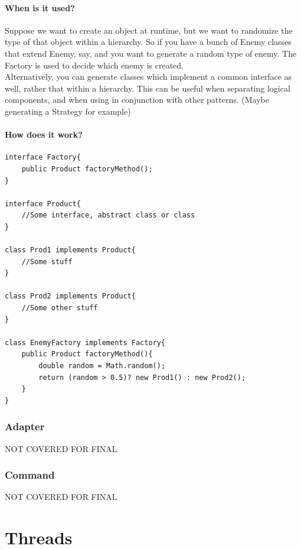 \documentclass[12pt]{article}
\theoremstyle{definition}
\begin{document}
\subsection{When is it used?}
Suppose we want to create an object at runtime, but we want to randomize the type of that object within a hierarchy. So if you have a bunch of Enemy classes that extend Enemy, say, and you want to generate a random type of enemy. The Factory is used to decide which enemy is created.
\\ \linebreak
Alternatively, you can generate classes which implement a common interface as well, rather that within a hierarchy. This can be useful when separating logical components, and when using in conjunction with other patterns. (Maybe generating a Strategy for example)
\\ \linebreak

\subsection{How does it work?}

\begin{lstlisting}
interface Factory{
	public Product factoryMethod();
}

interface Product{
	//Some interface, abstract class or class
}

class Prod1 implements Product{
	//Some stuff
}

class Prod2 implements Product{
	//Some other stuff
}

class EnemyFactory implements Factory{
	public Product factoryMethod(){
		double random = Math.random();
		return (random > 0.5)? new Prod1() : new Prod2(); 
	}
}
\end{lstlisting}


\section{Adapter}
NOT COVERED FOR FINAL

\section{Command}
NOT COVERED FOR FINAL

\part{Threads}
\end{document}
